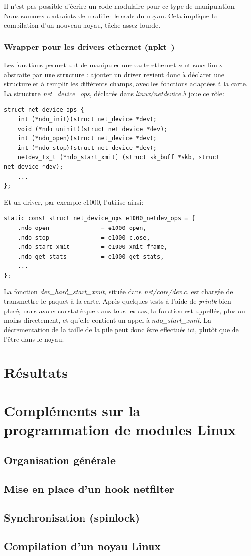 \documentclass[a4paper]{article}
\begin{document}
Il n’est pas possible d’écrire un code modulaire pour ce type de manipulation. Nous sommes contraints de modifier le code du noyau. Cela implique la compilation d’un nouveau noyau, tâche assez lourde. 

\subsubsection{Wrapper pour les drivers ethernet (npkt--)}
Les fonctions permettant de manipuler une carte ethernet sont sous
linux abstraite par une structure : ajouter un driver revient donc
à déclarer une structure et à remplir les différents champs, avec
les fonctions adaptées à la carte.
La structure \textit{net\_device\_ops}, déclarée dans
\textit{linux/netdevice.h} joue ce rôle:
\begin{verbatim}
struct net_device_ops {
    int (*ndo_init)(struct net_device *dev);
    void (*ndo_uninit)(struct net_device *dev);
    int (*ndo_open)(struct net_device *dev);
    int (*ndo_stop)(struct net_device *dev);
    netdev_tx_t (*ndo_start_xmit) (struct sk_buff *skb, struct net_device *dev);
    ...
};
\end{verbatim}

Et un driver, par exemple e1000, l'utilise ainsi:
\begin{verbatim}
static const struct net_device_ops e1000_netdev_ops = {
    .ndo_open               = e1000_open,
    .ndo_stop               = e1000_close,
    .ndo_start_xmit         = e1000_xmit_frame,
    .ndo_get_stats          = e1000_get_stats,
    ...
};
\end{verbatim}

La fonction \textit{dev\_hard\_start\_xmit}, située dans
\textit{net/core/dev.c}, est chargée de transmettre le paquet
à la carte. Après quelques tests à l'aide de \textit{printk} bien
placé, nous avons constaté que dans tous les cas, la fonction
est appellée, plus ou moins directement, et qu'elle contient 
un appel à \textit{ndo\_start\_xmit}. La décrementation de la
taille de la pile peut donc être effectuée ici, plutôt que de
l'être dans le noyau.

\section{Résultats}

\newpage



\newpage
\appendix

\section{Compléments sur la programmation de modules Linux}
\subsection{Organisation générale}
\subsection{Mise en place d'un hook netfilter}
\subsection{Synchronisation (spinlock)}
\subsection{Compilation d'un noyau Linux}
\end{document}
